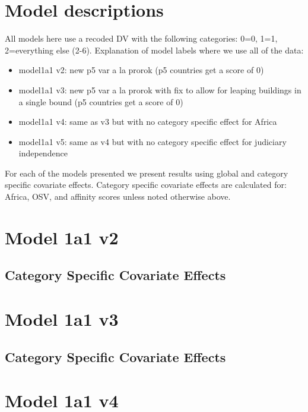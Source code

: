 \documentclass[]{article}
\begin{document}
\tableofcontents

\clearpage

\section*{Model descriptions}

All models here use a recoded DV with the following categories: 0=0, 1=1, 2=everything else (2-6). Explanation of model labels where we use all of the data:

\begin{itemize}
	\item model1a1 v2: new p5 var a la prorok (p5 countries get a score of 0)
	\item model1a1 v3: new p5 var a la prorok with fix to allow for leaping buildings in a single bound (p5 countries get a score of 0)
	\item model1a1 v4: same as v3 but with no category specific effect for Africa
	\item model1a1 v5: same as v4 but with no category specific effect for judiciary independence
\end{itemize}

For each of the models presented we present results using global and category specific covariate effects. Category specific covariate effects are calculated for: Africa, OSV, and affinity scores unless noted otherwise above.
\clearpage

\section{Model 1a1 v2}
\subsection{Category Specific Covariate Effects}

\clearpage

\section{Model 1a1 v3}
\subsection{Category Specific Covariate Effects}

\clearpage

\section{Model 1a1 v4}
\end{document}
